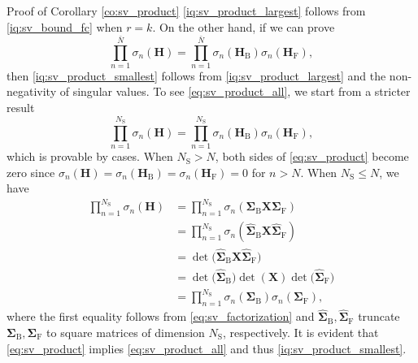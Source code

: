 \begin{appendix}
\begin{subsection}{Proof of Corollary \ref{co:sv_product}}\label{ap:sv_product}
	\eqref{iq:sv_product_largest} follows from \eqref{iq:sv_bound_fc} when $r = k$.
	On the other hand, if we can prove
	\begin{equation}
		\prod_{n=1}^{\bar{N}} \sigma_n(\mathbf{H}) = \prod_{n=1}^{\bar{N}} \sigma_n(\mathbf{H}_\mathrm{B}) \sigma_n(\mathbf{H}_\mathrm{F}),
		\label{eq:sv_product_all}
	\end{equation}
	then \eqref{iq:sv_product_smallest} follows from \eqref{iq:sv_product_largest} and the non-negativity of singular values.
	To see \eqref{eq:sv_product_all}, we start from a stricter result
	\begin{equation}
		\prod_{n=1}^{N_\mathrm{S}} \sigma_n(\mathbf{H}) = \prod_{n=1}^{N_\mathrm{S}} \sigma_n(\mathbf{H}_\mathrm{B}) \sigma_n(\mathbf{H}_\mathrm{F}),
		\label{eq:sv_product}
	\end{equation}
	which is provable by cases.
	When $N_\mathrm{S} > N$, both sides of \eqref{eq:sv_product} become zero since $\sigma_n(\mathbf{H}) = \sigma_n(\mathbf{H}_\mathrm{B}) = \sigma_n(\mathbf{H}_\mathrm{F}) = 0$ for $n > N$.
	When $N_\mathrm{S} \le N$, we have
	\begin{equation*}
		\begin{split}
			\prod\nolimits_{n=1}^{N_\mathrm{S}} \sigma_n(\mathbf{H})
			 & = \prod\nolimits_{n=1}^{N_\mathrm{S}} \sigma_n(\mathbf{\Sigma}_\mathrm{B} \mathbf{X} \mathbf{\Sigma}_\mathrm{F})             \\
			 & = \prod\nolimits_{n=1}^{N_\mathrm{S}} \sigma_n(\hat{\mathbf{\Sigma}}_\mathrm{B} \mathbf{X} \hat{\mathbf{\Sigma}}_\mathrm{F}) \\
			 & = \det\bigl(\hat{\mathbf{\Sigma}}_\mathrm{B} \mathbf{X} \hat{\mathbf{\Sigma}}_\mathrm{F}\bigr)                               \\
			 & = \det\bigl(\hat{\mathbf{\Sigma}}_\mathrm{B}\bigr) \det(\mathbf{X}) \det\bigl(\hat{\mathbf{\Sigma}}_\mathrm{F}\bigr)         \\
			 & = \prod\nolimits_{n=1}^{N_\mathrm{S}} \sigma_n(\mathbf{\Sigma}_\mathrm{B}) \sigma_n(\mathbf{\Sigma}_\mathrm{F}),
		\end{split}
	\end{equation*}
	where the first equality follows from \eqref{eq:sv_factorization} and $\hat{\mathbf{\Sigma}}_\mathrm{B}, \hat{\mathbf{\Sigma}}_\mathrm{F}$ truncate $\mathbf{\Sigma}_\mathrm{B}, \mathbf{\Sigma}_\mathrm{F}$ to square matrices of dimension $N_\mathrm{S}$, respectively.
	It is evident that \eqref{eq:sv_product} implies \eqref{eq:sv_product_all} and thus \eqref{iq:sv_product_smallest}.
\end{subsection}


\end{appendix}
